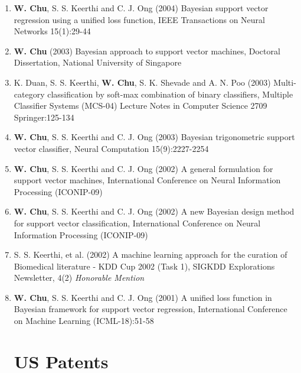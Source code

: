 \documentclass[line,10pt,final]{res}
\begin{document}
\begin{resume}
\begin{enumerate}
\item  {\bf W. Chu}, S. S. Keerthi and C. J. Ong (2004)  Bayesian support vector regression using a unified loss function,  IEEE Transactions on Neural Networks 15(1):29-44  
\item  {\bf W. Chu} (2003)  Bayesian approach to support vector machines, Doctoral Dissertation, National University of Singapore  
\item K. Duan, S. S. Keerthi,  {\bf W. Chu}, S. K. Shevade and A. N. Poo  (2003)  Multi-category classification by soft-max combination of binary classifiers,  Multiple Classifier Systems (MCS-04) Lecture Notes in Computer Science 2709   Springer:125-134
\item  {\bf W. Chu}, S. S. Keerthi and C. J. Ong (2003)  Bayesian trigonometric support vector classifier,  Neural Computation 15(9):2227-2254  
\item  {\bf W. Chu}, S. S. Keerthi and C. J. Ong (2002)  A general formulation for support vector machines,  International Conference on Neural Information Processing (ICONIP-09)
\item  {\bf W. Chu}, S. S. Keerthi and C. J. Ong (2002)  A new Bayesian design method for support vector classification,  International Conference on Neural Information Processing (ICONIP-09)
\item S. S. Keerthi, et al. (2002)  A machine learning approach for the curation of Biomedical literature - KDD Cup 2002 (Task 1),  SIGKDD Explorations Newsletter, 4(2)  {\em Honorable Mention}
\item  {\bf W. Chu}, S. S. Keerthi and C. J. Ong (2001)  A unified loss function in Bayesian framework for support vector regression,  International Conference on Machine Learning (ICML-18):51-58


\section{\sc US Patents}


\end{enumerate}
\end{resume}
\end{document}
